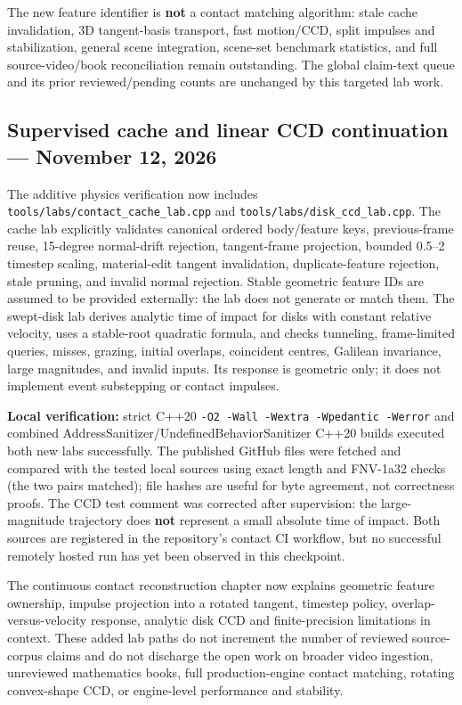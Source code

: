 The new feature identifier is \textbf{not} a contact matching algorithm: stale cache invalidation, 3D tangent-basis transport, fast motion/CCD, split impulses and stabilization, general scene integration, scene-set benchmark statistics, and full source-video/book reconciliation remain outstanding. The global claim-text queue and its prior reviewed/pending counts are unchanged by this targeted lab work.

\subsection{Supervised cache and linear CCD continuation --- November 12, 2026}\label{appendix-3b67654799a2-supervised-cache-and-linear-ccd-continuation-november-12-2026}

The additive physics verification now includes \texttt{tools/labs/contact\_cache\_lab.cpp} and \texttt{tools/labs/disk\_ccd\_lab.cpp}. The cache lab explicitly validates canonical ordered body/feature keys, previous-frame reuse, 15-degree normal-drift rejection, tangent-frame projection, bounded 0.5--2 timestep scaling, material-edit tangent invalidation, duplicate-feature rejection, stale pruning, and invalid normal rejection. Stable geometric feature IDs are assumed to be provided externally: the lab does not generate or match them. The swept-disk lab derives analytic time of impact for disks with constant relative velocity, uses a stable-root quadratic formula, and checks tunneling, frame-limited queries, misses, grazing, initial overlaps, coincident centres, Galilean invariance, large magnitudes, and invalid inputs. Its response is geometric only; it does not implement event substepping or contact impulses.

\textbf{Local verification:} strict C++20 \texttt{-O2\ -Wall\ -Wextra\ -Wpedantic\ -Werror} and combined AddressSanitizer/UndefinedBehaviorSanitizer C++20 builds executed both new labs successfully. The published GitHub files were fetched and compared with the tested local sources using exact length and FNV-1a32 checks (the two pairs matched); file hashes are useful for byte agreement, not correctness proofs. The CCD test comment was corrected after supervision: the large-magnitude trajectory does \textbf{not} represent a small absolute time of impact. Both sources are registered in the repository's contact CI workflow, but no successful remotely hosted run has yet been observed in this checkpoint.

The continuous contact reconstruction chapter now explains geometric feature ownership, impulse projection into a rotated tangent, timestep policy, overlap-versus-velocity response, analytic disk CCD and finite-precision limitations in context. These added lab paths do not increment the number of reviewed source-corpus claims and do not discharge the open work on broader video ingestion, unreviewed mathematics books, full production-engine contact matching, rotating convex-shape CCD, or engine-level performance and stability.

